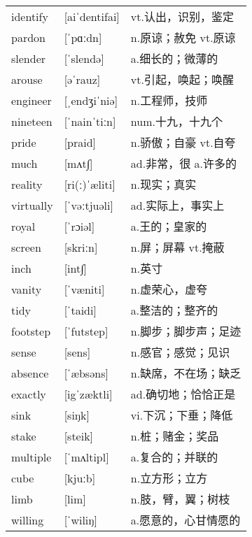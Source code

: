 \documentclass[a4paper]{article}
\begin{document}
\section{}
\begin{tabular}{l l l}

identify & [aiˈdentifai] & vt.认出，识别，鉴定 \\
pardon & [ˈpɑːdn] & n.原谅；赦免 vt.原谅 \\
slender & [ˈslendə] & a.细长的；微薄的 \\
arouse & [əˈrauz] & vt.引起，唤起；唤醒 \\
engineer & [ˌendʒiˈniə] & n.工程师，技师 \\
nineteen & [ˈnainˈtiːn] & num.十九，十九个 \\
pride & [praid] & n.骄傲；自豪 vt.自夸 \\
much & [mʌt∫] & ad.非常，很 a.许多的 \\
reality & [ri(ː)ˈæliti] & n.现实；真实 \\
virtually & [ˈvəːtjuəli] & ad.实际上，事实上 \\
royal & [ˈrɔiəl] & a.王的；皇家的 \\
screen & [skriːn] & n.屏；屏幕 vt.掩蔽 \\
inch & [int∫] & n.英寸 \\
vanity & [ˈvæniti] & n.虚荣心，虚夸 \\
tidy & [ˈtaidi] & a.整洁的；整齐的 \\
footstep & [ˈfutstep] & n.脚步；脚步声；足迹 \\
sense & [sens] & n.感官；感觉；见识 \\
absence & [ˈæbsəns] & n.缺席，不在场；缺乏 \\
exactly & [igˈzæktli] & ad.确切地；恰恰正是 \\
sink & [siŋk] & vi.下沉；下垂；降低 \\
stake & [steik] & n.桩；赌金；奖品 \\
multiple & [ˈmʌltipl] & a.复合的；并联的 \\
cube & [kjuːb] & n.立方形；立方 \\
limb & [lim] & n.肢，臂，翼；树枝 \\
willing & [ˈwiliŋ] & a.愿意的，心甘情愿的 \\

\end{tabular}
\end{document}
